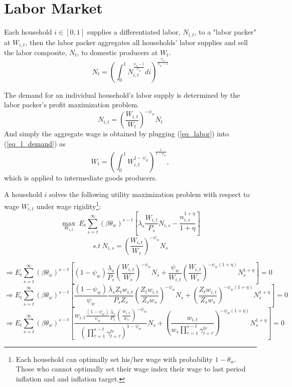 \documentclass[11pt,titlepage]{article}
\begin{document}
\section{Labor Market}

Each household $i \in [0,1]$ supplies a differentiated labor, $N_{i,t}$, to a "labor packer" at $W_{i,t}$, then the labor packer aggregates all households' labor supplies and sell the labor composite, $N_t$, to domestic producers at $W_t$.
\begin{equation}N_t = \left(\int_0^1 N_{i,t}^{\frac{\psi_w-1}{\psi_w}} di\right)^{\frac{\psi_w}{\psi_w -1}}\label{eq_labor}\end{equation} 
 
The demand for an individual household's labor supply is determined by the labor packer's profit maximization problem. \\
\begin{equation}N_{i,t} = \left( \frac{W_{i,t}} {W_t}\right)^{-\psi_w} N_t  \label{eq_l_demand}\end{equation}
And simply the aggregate wage is obtained by plugging (\ref{eq_labor}) into (\ref{eq_l_demand}) as  
\[W_t = \left( \int_0^1 W_{i,t}^{1-\psi_w} \right)^{\frac{1}{1-\psi_w}},\]which is applied to intermediate goods producers.

A household $i$ solves the following utility maximization problem with respect to wage $W_{i,t}$ under wage rigidity\footnote{Each household can optimally set his/her wage with probability $1-\theta_w$. Those who cannot optimally set their wage index their wage to last period inflation and and inflation target.}:
\[\max_{{W_{i,t}}}~E_t \sum_{s=t}^{\infty} (\beta \theta_w)^{s-t}\left[\lambda_{s} \frac{W_{i,t}}{P_s}N_{i,s} - \frac{n_{i,s}^{1+\eta}}{1+\eta} \right] \]
\[s.t~ N_{i,s} = \left( \frac{W_{i,t}} {W_s}\right)^{-\psi_w} N_s \] 

\begin{equation} \Rightarrow E_t \sum_{s=t}^{\infty} (\beta \theta_w)^{s-t}
\left[(1-\psi_w) \frac{\lambda_{s}}{P_s} \left(\frac{W_{i,t}}{W_{s}} \right)^{-\psi_w} N_s + \frac{\psi_w}{W_{i,t}} \left( \frac{W_{i,t}}{W_s} \right)^{-\psi_w (1+\eta)}N_s^{1+\eta}\right]=0 \label{foc_labor1}\end{equation}
\begin{equation} \Rightarrow E_t \sum_{s=t}^{\infty} (\beta \theta_w)^{s-t}
\left[\frac{(1-\psi_w)}{\psi_w} \frac{\bar{\lambda}_{s}Z_t w_{i,t}}{P_s Z_s} \left(\frac{Z_t w_{i,t}}{Z_s w_{s}} \right)^{-\psi_w} N_s + \left(\frac{Z_t w_{i,t}}{Z_s w_s} \right)^{-\psi_w (1+\eta)}N_s^{1+\eta}\right]=0 \label{foc_labor11}\end{equation}
\begin{equation} \Rightarrow E_t \sum_{s=t}^{\infty} (\beta \theta_w)^{s-t}
\left[\frac{w_{i,t}\frac{(1-\psi_w)}{\psi_w} \frac{\bar{\lambda}_{s}}{P_s} \left(\frac{w_{i,t}}{w_{s}} \right)^{-\psi_w}}{\left(\prod_{\tau=1}^{s-t}\gamma^{tr}_{t+\tau}\right)^{1-\psi_w}}N_s + \left(\frac{w_{i,t}}{w_s\prod_{\tau=1}^{s-t}\gamma^{tr}_{t+\tau}} \right)^{-\psi_w (1+\eta)}N_s^{1+\eta}\right]=0 \label{foc_labor11}\end{equation}
\end{document}
